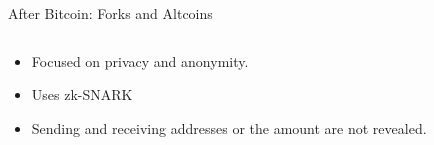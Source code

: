 \documentclass[]{beamer}
\begin{document}
\begin{frame}{After Bitcoin: Forks and Altcoins}
\begin{columns}
		\begin{small}
			\begin{itemize}
				\item Focused on privacy and anonymity.
				\item Uses zk-SNARK
				\item Sending and receiving addresses or the amount are not revealed.
			\end{itemize}
		\end{small}
	\end{columns}	
\end{frame}
\end{document}
